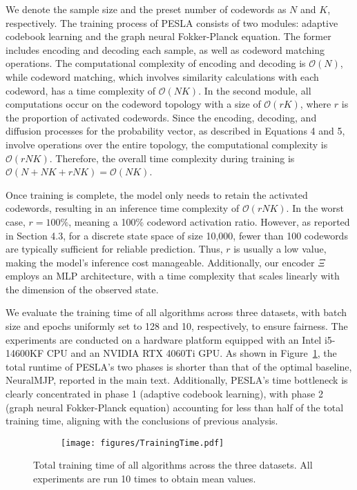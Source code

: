 We denote the sample size and the preset number of codewords as $N$ and $K$, respectively. The training process of PESLA consists of two modules: adaptive codebook learning and the graph neural Fokker-Planck equation. The former includes encoding and decoding each sample, as well as codeword matching operations. The computational complexity of encoding and decoding is $\mathcal{O}(N)$, while codeword matching, which involves similarity calculations with each codeword, has a time complexity of $\mathcal{O}(NK)$. In the second module, all computations occur on the codeword topology with a size of $\mathcal{O}(rK)$, where $r$ is the proportion of activated codewords. Since the encoding, decoding, and diffusion processes for the probability vector, as described in Equations 4 and 5, involve operations over the entire topology, the computational complexity is $\mathcal{O}(rNK)$. Therefore, the overall time complexity during training is $\mathcal{O}(N+NK+rNK)=\mathcal{O}(NK)$.

Once training is complete, the model only needs to retain the activated codewords, resulting in an inference time complexity of $\mathcal{O}(rNK)$. In the worst case, $r=100\%$, meaning a 100\% codeword activation ratio. However, as reported in Section 4.3, for a discrete state space of size 10,000, fewer than 100 codewords are typically sufficient for reliable prediction. Thus, $r$ is usually a low value, making the model's inference cost manageable. Additionally, our encoder $\Xi$ employs an MLP architecture, with a time complexity that scales linearly with the dimension of the observed state.

We evaluate the training time of all algorithms across three datasets, with batch size and epochs uniformly set to 128 and 10, respectively, to ensure fairness. The experiments are conducted on a hardware platform equipped with an Intel i5-14600KF CPU and an NVIDIA RTX 4060Ti GPU. As shown in Figure~\ref{fig:training_time}, the total runtime of PESLA's two phases is shorter than that of the optimal baseline, NeuralMJP, reported in the main text. Additionally, PESLA’s time bottleneck is clearly concentrated in phase 1 (adaptive codebook learning), with phase 2 (graph neural Fokker-Planck equation) accounting for less than half of the total training time, aligning with the conclusions of previous analysis.

\begin{figure}[!ht]
    \centering
    \begin{subfigure}[b]{\textwidth} %
        \centering
        \texttt{[image: figures/TrainingTime.pdf]}
    \end{subfigure}

    \caption{Total training time of all algorithms across the three datasets. All experiments are run 10 times to obtain mean values.}
    \label{fig:training_time}
\end{figure}


